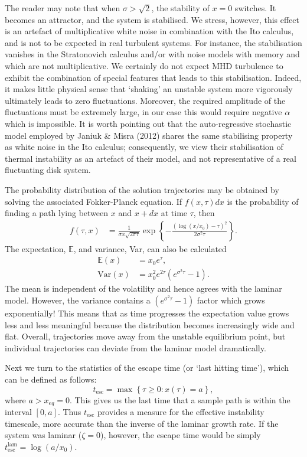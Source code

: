 \documentclass[useAMS]{mn2e}
\begin{document}
The reader may note that when $\sigma>\sqrt{2}$, the stability of
$x=0$ switches. It becomes an attractor, and the
system is stabilised. We stress, however, this effect is an artefact of
multiplicative white
noise in combination with the Ito calculus, and is not to be expected
in real turbulent systems. For instance, the stabilisation vanishes
in the Stratonovich calculus and/or with noise models with memory and
which are not multiplicative. We
certainly do not expect MHD turbulence to exhibit the combination of special
features that leads to this stabilisation. 
Indeed, it makes little physical sense that `shaking' an unstable
system more vigorously ultimately leads to zero
fluctuations. Moreover, 
the required amplitude of the fluctuations
must be extremely large, in our case this would require negative $\alpha$ which is impossible.
It is worth pointing out that the auto-regressive stochastic model
employed by Janiuk \& Misra (2012) shares the same stabilising property as white
noise in the Ito calculus; consequently, we view their
stabilisation of thermal instability as an artefact of their
model, and
not representative of a real fluctuating disk system.


The probability distribution of the solution trajectories may be obtained by
solving the associated Fokker-Planck equation. If $f(x,\tau)dx$ is the
probability of finding a path lying between $x$ and $x+dx$ at time
$\tau$, then 
\begin{align}
f(\tau,x)&=\frac{1}{\sigma x\sqrt{2\pi \tau}}\exp\left\{-\frac{(\log(x/x_{0})-\tau)^{2}}{2\sigma^{2}\tau}\right\}.
\end{align}
The expectation, $\mathbb{E}$, and variance, Var, can also be calculated 
\begin{align}
\mathbb{E}\left(x\right)&=x_{0}e^{\tau}, \\
\textrm{Var}\left(x\right)&=x_{0}^{2}e^{2\tau}\left(e^{\sigma^{2}\tau}-1\right).
\end{align}
The mean is independent of the volatility and
hence agrees with the laminar model. However, the variance contains a
$(e^{\sigma^{2}\tau}-1)$ factor which grows exponentially! This
means that as time progresses the expectation value grows less and less
meaningful because the distribution becomes increasingly wide and flat.
Overall, trajectories move away from the unstable equilibrium point,
but
individual trajectories can deviate from the laminar model dramatically.

Next we turn to the statistics of the escape time (or `last hitting
time'), which
 can be defined as follows:
\begin{equation}
t_{\text{esc}}=\max\left\lbrace \tau\geq0:x(\tau)= a\right\rbrace,
\end{equation}
where $a>x_{eq}=0$. This gives us the last time that a sample path is within the
interval $[0,a]$. Thus
$t_{\text{esc}}$ provides a measure for the effective instability timescale,
more accurate than the inverse of the laminar growth
rate. If the system was laminar ($\zeta=0$), however, the escape time
would be simply $t_{\text{esc}}^{\text{lam}}= \log(a/x_0)$. 
\end{document}
